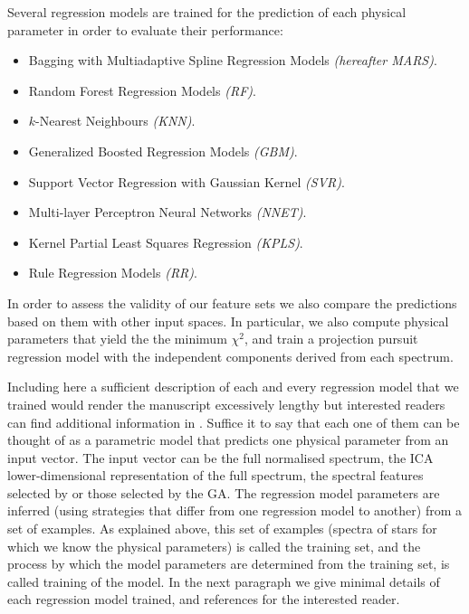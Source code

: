 Several regression models are trained for the prediction of each
physical parameter in order to evaluate their performance:

\begin{itemize}

\item {Bagging with Multiadaptive Spline Regression Models \emph{(hereafter MARS)}.}

\item {Random Forest Regression Models \emph{(RF)}.}

\item {$k$-Nearest Neighbours \emph{(KNN)}.}

\item {Generalized Boosted Regression Models \emph{(GBM)}.}

\item {Support Vector Regression with Gaussian Kernel \emph{(SVR)}.}

\item {Multi-layer Perceptron Neural Networks \emph{(NNET)}.}

\item {Kernel Partial Least Squares Regression \emph{(KPLS)}.}

\item {Rule Regression Models \emph{(RR)}.}

\end{itemize}

In order to assess the validity of our feature sets we also compare
the predictions based on them with other input spaces. In particular,
we also compute physical parameters that yield the the minimum
$\chi^2$, and train a projection pursuit regression model with the
independent components \citep{Hyvarinen:1998:NAD:302528.302606}
derived from each spectrum.

Including here a sufficient description of each and every regression
model that we trained would render the manuscript excessively lengthy
but interested readers can find additional information in
\cite{baraud2002model,geman1992neural,elith2008working,
meyer2003support,svetnik2003random}.  Suffice it to say that each one
of them can be thought of as a parametric model that predicts one
physical parameter from an input vector. The input vector can be the
full normalised spectrum, the ICA lower-dimensional representation of
the full spectrum, the spectral features selected by \cite{cesetti} or
those selected by the GA. The regression model parameters are inferred
(using strategies that differ from one regression model to
another) from a set of examples. As explained above, this set of
examples (spectra of stars for which we know the physical parameters)
is called the training set, and the process by which the model
parameters are determined from the training set, is called training of
the model. In the next paragraph we give minimal details of each
regression model trained, and references for the interested reader.

